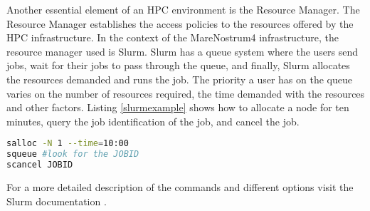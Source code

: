 Another essential element of an HPC environment is the Resource Manager. The Resource Manager establishes the access policies to the resources offered by the HPC infrastructure. In the context of the MareNostrum4 infrastructure, the resource manager used is Slurm\cite{slurm}.  Slurm has a queue system where the users send jobs, wait for their jobs to pass through the queue, and finally, Slurm allocates the resources demanded and runs the job.
The priority a user has on the queue varies on the number of resources required, the time demanded with the resources and other factors. Listing \ref{slurmexample} shows how to allocate a node for ten minutes, query the job identification of the job, and cancel the job.

\begin{lstlisting}[language=sh, caption={Example of slurm usage.}, label={slurmexample}]
salloc -N 1 --time=10:00
squeue #look for the JOBID
scancel JOBID
\end{lstlisting}

For a more detailed description of the commands and different options visit the Slurm documentation \cite{slurmdocu}.

